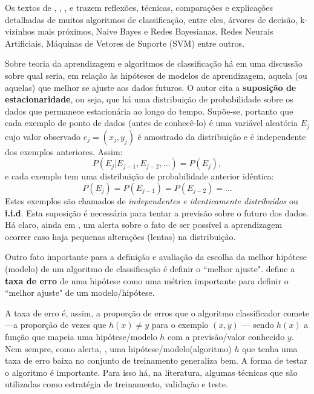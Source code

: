 Os textos de \cite{classification2013}, \cite{performance_classification2013}, \cite{Wolpert:1996}, \cite{classification_survey2012} e \cite{using_data_mining2012}  trazem reflexões, técnicas, comparações e explicações detalhadas de muitos algoritmos de classificação, entre eles, árvores de decisão, k-vizinhos mais próximos, Naive Bayes e Redes Bayesianas, Redes Neurais Artificiais, Máquinas de Vetores de Suporte (SVM) entre outros.   

Sobre teoria da aprendizagem e algoritmos de classificação há em \cite{Norvig2013} uma discussão sobre qual seria, em relação às hipóteses de modelos de aprendizagem, aquela (ou aquelas) que melhor se ajuste aos dados futuros. O autor cita a \textbf{suposição de estacionaridade}, ou seja, que há uma distribuição de probabilidade sobre os dados que permanece estacionária ao longo do tempo. Supõe-se, portanto que cada exemplo de ponto de dados (antes de conhecê-lo) é uma variável aleatória $E_j$ cujo valor observado $e_j = (x_j, y_j)$ é amostrado da distribuição e é independente dos exemplos anteriores. Assim:
\begin{equation}
P(E_j|E_{j-1},E_{j-2}, ... ) = P(E_j), 
\end{equation}
e cada exemplo tem uma distribuição de probabilidade anterior idêntica:
\begin{equation}
P(E_j) = P(E_{j-1}) = P(E_{j-2}) = ... 
\end{equation}
Estes exemplos são chamados de \textit{independentes e identicamente distribuídos} ou \textbf{i.i.d}. Esta suposição é necessária para tentar a previsão sobre o futuro dos dados. Há claro, ainda em \cite{Norvig2013}, um alerta sobre o fato de ser possível a aprendizagem ocorrer caso haja pequenas alterações (lentas) na distribuição.

Outro fato importante para a definição e avaliação da escolha da melhor hipótese (modelo) de um algoritmo de classificação é definir o ``melhor ajuste". \cite{Norvig2013} define a \textbf{taxa de erro} de uma hipótese como uma métrica importante para definir o ``melhor ajuste" de um modelo/hipótese.

A taxa de erro é, assim, a proporção de erros que o algoritmo classificador comete---a proporção de vezes que $h(x)\neq y$ para o exemplo $(x,y)$ --- sendo $h(x)$ a função que mapeia uma hipótese/modelo $h$ com a previsão/valor conhecido $y$. Nem sempre, como alerta, \cite{Norvig2013}, uma hipótese/modelo(algoritmo) $h$ que tenha uma taxa de erro baixa no conjunto de treinamento generaliza bem. A forma de testar o algoritmo é importante. Para isso há, na literatura, algumas técnicas que são utilizadas como estratégia de treinamento, validação e teste.

